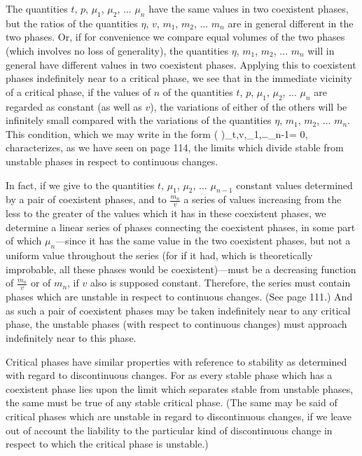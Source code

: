 \documentclass[12pt]{memoir}
\begin{document}
The quantities $t$, $p$, $\mu_1$, $\mu_2$, ... $\mu_n$ have the same values in two coexistent phases, but the ratios of the quantities $\eta$, $v$, $m_1$, $m_2$, ... $m_n$ are in general different in the two phases. Or, if for convenience we compare equal volumes of the two phases (which involves no loss of generality), the quantities $\eta$, $m_1$, $m_2$, ... $m_n$ will in general have different values in two coexistent phases. Applying this to coexistent phases indefinitely near to a critical phase, we see that in the immediate vicinity of a critical phase, if the values of $n$ of the quantities $t$, $p$, $\mu_1$, $\mu_2$, ... $\mu_n$ are regarded as constant (as well as $v$), the variations of either of the others will be infinitely small compared with the variations of the quantities $\eta$, $m_1$, $m_2$, ... $m_n$. This condition, which we may write in the form
\eqs \left( \right)_{t,v,\mu_1,\dots \mu_{n-1}}= 0,\label{200}
\eqe
characterizes, as we have seen on page 114, the limits which divide stable from unstable phases in respect to continuous changes.


In fact, if we give to the quantities $t$, $\mu_1$, $\mu_2$, ... $\mu_{n-1}$ constant values determined by a pair of coexistent phases, and to $\frac{m_n}{v}$ a series of values increasing from the less to the greater of the values which it has in these coexistent phases, we determine a linear series of phases connecting the coexistent phases, in some part of which $\mu_n$---since it has the same value in the two coexistent phases, but not a uniform value throughout the series (for if it had, which is theoretically improbable, all these phases would be coexistent)---must be a decreasing
function of $\frac{m_n}{v}$ or of $m_n$, if $v$ also is supposed constant. Therefore, the series must contain phases which are unstable in respect to continuous changes. (See page 111.) And as such a pair of coexistent phases may be taken indefinitely near to any critical phase, the unstable phases (with respect to continuous changes) must approach indefinitely near to this phase.


Critical phases have similar properties with reference to stability as determined with regard to discontinuous changes. For as every stable phase which has a coexistent phase lies upon the limit which separates stable from unstable phases, the same must be true of any stable critical phase. (The same may be said of critical phases which are unstable in regard to discontinuous changes, if we leave out of account the liability to the particular kind of discontinuous change in respect to which the critical phase is unstable.)
\end{document}
